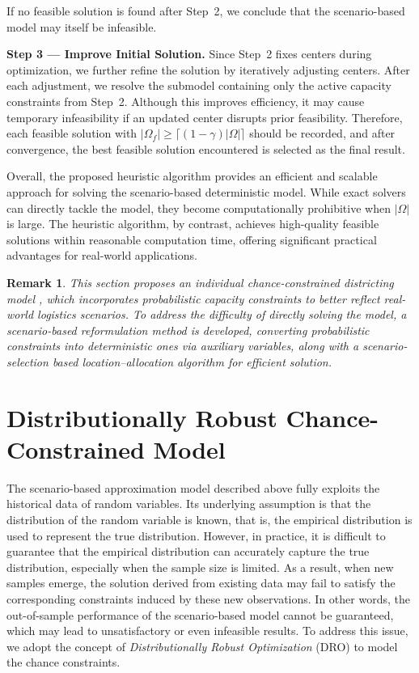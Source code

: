 \documentclass[preprint,12pt,authoryear]{elsarticle}
\newtheorem{remark}{Remark}
\begin{document}
If no feasible solution is found after Step~2, we conclude that the scenario-based model may itself be infeasible.

\textbf{Step 3 — Improve Initial Solution.}  
Since Step~2 fixes centers during optimization, we further refine the solution by iteratively adjusting centers. After each adjustment, we resolve the submodel containing only the active capacity constraints from Step~2. Although this improves efficiency, it may cause temporary infeasibility if an updated center disrupts prior feasibility. Therefore, each feasible solution with $|\Omega_f|\geqslant\lceil(1-\gamma)|\Omega|\rceil$ should be recorded, and after convergence, the best feasible solution encountered is selected as the final result.

Overall, the proposed heuristic algorithm provides an efficient and scalable approach for solving the scenario-based deterministic model. While exact solvers can directly tackle the model, they become computationally prohibitive when $|\Omega|$ is large. The heuristic algorithm, by contrast, achieves high-quality feasible solutions within reasonable computation time, offering significant practical advantages for real-world applications.

\begin{remark}
This section proposes an individual chance-constrained districting model , which incorporates probabilistic capacity constraints to better reflect real-world logistics scenarios. To address the difficulty of directly solving the model, a scenario-based reformulation method is developed, converting probabilistic constraints into deterministic ones via auxiliary variables, along with a scenario-selection based location–allocation algorithm for efficient solution.
\end{remark}

\section{Distributionally Robust Chance-Constrained Model}
\label{sec:dricc}

The scenario-based approximation model described above fully exploits the historical data of random variables. Its underlying assumption is that the distribution of the random variable is known, that is, the empirical distribution is used to represent the true distribution. However, in practice, it is difficult to guarantee that the empirical distribution can accurately capture the true distribution, especially when the sample size is limited. As a result, when new samples emerge, the solution derived from existing data may fail to satisfy the corresponding constraints induced by these new observations. In other words, the out-of-sample performance of the scenario-based model cannot be guaranteed, which may lead to unsatisfactory or even infeasible results. To address this issue, we adopt the concept of \textit{Distributionally Robust Optimization} (DRO) to model the chance constraints.
\end{document}
